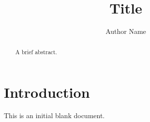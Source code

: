 \documentclass[runningheads]{llncs}
\begin{document}
\title{Title}
\author{Author Name}

\maketitle

\begin{abstract}
A brief abstract.

\end{abstract}

\section{Introduction}
This is an initial blank document.


% 
\end{document}
